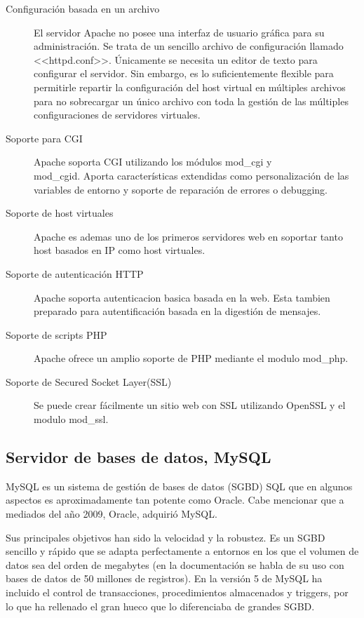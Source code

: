 \begin{description}
    \item[Configuración basada en un archivo] El servidor Apache no posee una interfaz de usuario gráfica para su administración. Se trata de un sencillo archivo de configuración llamado <<httpd.conf>>. Únicamente se necesita un editor de texto para configurar el servidor. Sin embargo, es lo suficientemente flexible para permitirle repartir la configuración del host virtual en múltiples archivos para no sobrecargar un único archivo con toda la gestión de las múltiples configuraciones de servidores virtuales.
    
    \item[Soporte para CGI] Apache soporta CGI utilizando los módulos mod\_cgi y \\mod\_cgid. Aporta características extendidas como personalización de las variables de entorno y soporte de reparación de errores o debugging.
    
    \item[Soporte de host virtuales] Apache es ademas uno de los primeros servidores web en soportar tanto host basados en IP como host virtuales.
    
    \item[Soporte de autenticación HTTP] Apache soporta autenticacion basica basada en la web. Esta tambien preparado para autentificación basada en la digestión de mensajes.
    
   \item[Soporte de scripts PHP] Apache ofrece un amplio soporte de PHP mediante el modulo mod\_php.
   
   \item[Soporte de Secured Socket Layer(SSL)] Se puede crear fácilmente un sitio web con SSL utilizando OpenSSL y el modulo mod\_ssl.
\end{description}




\subsection{Servidor de bases de datos, MySQL}
MySQL es un sistema de gestión de bases de datos (SGBD) SQL que en algunos aspectos es aproximadamente tan potente como Oracle. Cabe mencionar que a mediados del año 2009, Oracle, adquirió MySQL.



Sus principales objetivos han sido la velocidad y la robustez. Es un SGBD sencillo y rápido que se adapta perfectamente a entornos en los que el volumen de datos sea del orden de megabytes (en la documentación se habla de su uso con bases de datos de 50 millones de registros). En la versión 5 de MySQL ha incluido el control de transacciones, procedimientos almacenados y triggers, por lo que ha rellenado el gran hueco que lo diferenciaba de grandes SGBD.





